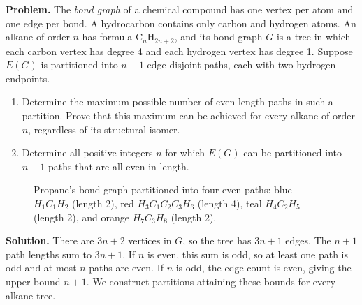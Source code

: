 \Challenge{} \Uni{} \textbf{Problem.} The \emph{bond graph} of a chemical compound has one vertex per atom and one edge per bond. A hydrocarbon contains only carbon and hydrogen atoms. An alkane of order $n$ has formula $\text{C}_n\text{H}_{2n+2}$, and its bond graph $G$ is a tree in which each carbon vertex has degree 4 and each hydrogen vertex has degree 1. Suppose $E(G)$ is partitioned into $n+1$ edge-disjoint paths, each with two hydrogen endpoints.
\begin{enumerate}
\item Determine the maximum possible number of even-length paths in such a partition. Prove that this maximum can be achieved for every alkane of order $n$, regardless of its structural isomer.
\item Determine all positive integers $n$ for which $E(G)$ can be partitioned into $n+1$ paths that are all even in length.
\end{enumerate}

\begin{figure}[htbp]
\centering
{}
\caption{Propane's bond graph partitioned into four even paths: blue $H_1C_1H_2$ (length 2), red $H_3C_1C_2C_3H_6$ (length 4), teal $H_4C_2H_5$ (length 2), and orange $H_7C_3H_8$ (length 2).}
\end{figure}

\textbf{Solution.} There are $3n+2$ vertices in $G$, so the tree has $3n+1$ edges. The $n+1$ path lengths sum to $3n+1$. If $n$ is even, this sum is odd, so at least one path is odd and at most $n$ paths are even. If $n$ is odd, the edge count is even, giving the upper bound $n+1$. We construct partitions attaining these bounds for every alkane tree.

